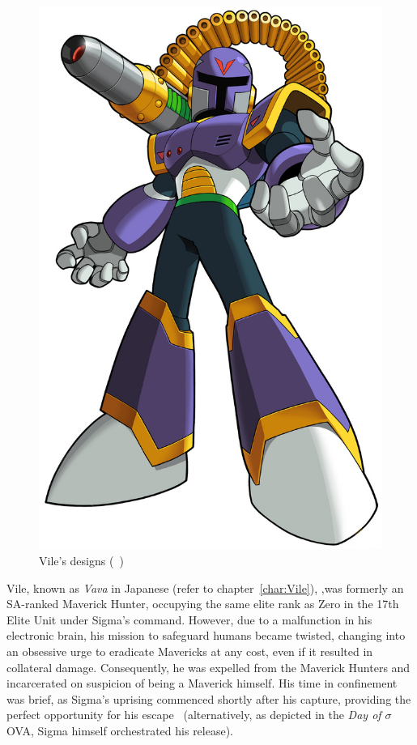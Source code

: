 \begin{figure}[htp]
	\includegraphics[height=\portraitsize]{figures/X1/Sigma_stages/MhxVile.png}
	\caption{Vile's designs (~\cite{book:MMX_Complete_art})}
\end{figure}
Vile, known as \textit{Vava} in Japanese (refer to chapter~\ref{char:Vile}), ,was formerly an SA-ranked Maverick Hunter, occupying the same elite rank as Zero in the 17th Elite Unit under Sigma's command. However, due to a malfunction in his electronic brain, his mission to safeguard humans became twisted, changing into an obsessive urge to eradicate Mavericks at any cost, even if it resulted in collateral damage. Consequently, he was expelled from the Maverick Hunters and incarcerated on suspicion of being a Maverick himself. His time in confinement was brief, as Sigma's uprising commenced shortly after his capture, providing the perfect opportunity for his escape~\cite{Xcoll1:Manual_X1,MHX:manual, wayback:X_resources} (alternatively, as depicted in the \textit{Day of $\sigma$} OVA, Sigma himself orchestrated his release).


